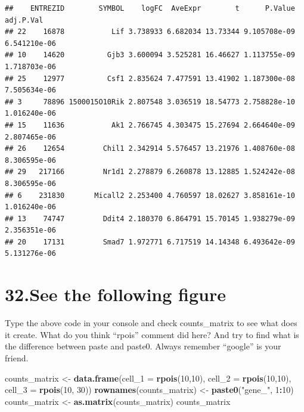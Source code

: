 \documentclass[]{article}
\newenvironment{Shaded}{\begin{snugshade}}{\end{snugshade}}
\newcommand{\DataTypeTok}[1]{\textcolor[rgb]{0.13,0.29,0.53}{#1}}
\newcommand{\DecValTok}[1]{\textcolor[rgb]{0.00,0.00,0.81}{#1}}
\newcommand{\KeywordTok}[1]{\textcolor[rgb]{0.13,0.29,0.53}{\textbf{#1}}}
\newcommand{\NormalTok}[1]{#1}
\newcommand{\OperatorTok}[1]{\textcolor[rgb]{0.81,0.36,0.00}{\textbf{#1}}}
\newcommand{\StringTok}[1]{\textcolor[rgb]{0.31,0.60,0.02}{#1}}
\begin{document}
\begin{verbatim}
##    ENTREZID        SYMBOL    logFC  AveExpr        t      P.Value    adj.P.Val
## 22    16878           Lif 3.738933 6.682034 13.73344 9.105708e-09 6.541210e-06
## 10    14620          Gjb3 3.600094 3.525281 16.46627 1.113755e-09 1.718703e-06
## 25    12977          Csf1 2.835624 7.477591 13.41902 1.187300e-08 7.505634e-06
## 3     78896 1500015O10Rik 2.807548 3.036519 18.54773 2.758828e-10 1.016240e-06
## 15    11636           Ak1 2.766745 4.303475 15.27694 2.664640e-09 2.807465e-06
## 26    12654         Chil1 2.342914 5.576457 13.21976 1.408760e-08 8.306595e-06
## 29   217166         Nr1d1 2.278879 6.260878 13.12885 1.524242e-08 8.306595e-06
## 6    231830       Micall2 2.253400 4.760597 18.02627 3.858161e-10 1.016240e-06
## 13    74747         Ddit4 2.180370 6.864791 15.70145 1.938279e-09 2.356351e-06
## 20    17131         Smad7 1.972771 6.717519 14.14348 6.493642e-09 5.131276e-06
\end{verbatim}

\hypertarget{see-the-following-figure}{%
\section{32.See the following figure}\label{see-the-following-figure}}

Type the above code in your console and check counts\_matrix to see what
does it create. What do you think ``rpois'' comment did here? And try to
find what is the difference between paste and paste0. Always remember
``google'' is your friend.

\begin{Shaded}
\begin{Highlighting}[]
\NormalTok{counts_matrix <-}\StringTok{ }\KeywordTok{data.frame}\NormalTok{(}\DataTypeTok{cell_1 =} \KeywordTok{rpois}\NormalTok{(}\DecValTok{10}\NormalTok{,}\DecValTok{10}\NormalTok{),}
                            \DataTypeTok{cell_2 =} \KeywordTok{rpois}\NormalTok{(}\DecValTok{10}\NormalTok{,}\DecValTok{10}\NormalTok{),}
                            \DataTypeTok{cell_3 =} \KeywordTok{rpois}\NormalTok{(}\DecValTok{10}\NormalTok{, }\DecValTok{30}\NormalTok{))}
\KeywordTok{rownames}\NormalTok{(counts_matrix) <-}\StringTok{ }\KeywordTok{paste0}\NormalTok{(}\StringTok{"gene_"}\NormalTok{, }\DecValTok{1}\OperatorTok{:}\DecValTok{10}\NormalTok{)}
\NormalTok{counts_matrix <-}\StringTok{ }\KeywordTok{as.matrix}\NormalTok{(counts_matrix)}
\NormalTok{counts_matrix}
\end{Highlighting}
\end{Shaded}
\end{document}
